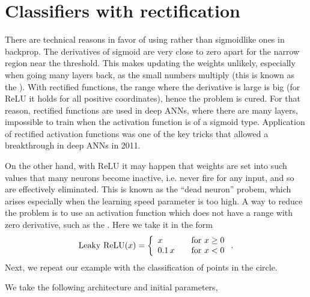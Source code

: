 \documentclass[letterpaper,10pt,english]{jupyterBook}
\begin{document}
\section{Classifiers with rectification}
\label{\detokenize{docs/rectification:classifiers-with-rectification}}
\sphinxAtStartPar
There are technical reasons in favor of using  rather than sigmoid\sphinxhyphen{}like ones in backprop. The derivatives of sigmoid are very close to zero apart for the narrow region near the threshold. This makes updating the weights unlikely, especially when going many layers back, as the small numbers multiply (this is known as the ). With rectified functions, the range where the derivative is large is big (for ReLU it holds for all positive coordinates), hence the problem is cured. For that reason, rectified functions are used in deep ANNs, where there are many layers, impossible to train when the activation function is of a sigmoid type.
Application of rectified activation functions was one of the key tricks that allowed a breakthrough in deep ANNs in 2011.

\sphinxAtStartPar
On the other hand, with ReLU it may happen that weights are set into such values that many neurons become inactive, i.e. never fire for any input, and so are effectively eliminated. This is known as the “dead neuron” probem, which arises especially when the learning speed parameter is too high. A way to reduce the problem is to use an activation function which does not have a range with zero derivative, such as the . Here we take it in the form
\begin{equation*}
\begin{split}
{\rm Leaky~ReLU}(x) = \left \{ \begin{array}{ll} x &{\rm ~~~ for~} x \ge 0 \\
                                          0.1 \, x &{\rm ~~~ for~} x < 0 \end{array}    \right . .
\end{split}
\end{equation*}
\sphinxAtStartPar
Next, we repeat our example with the classification of points in the circle.

\sphinxAtStartPar
We take the following architecture and initial parameters,

\begin{sphinxVerbatim}[commandchars=\\\{\}]
\PYG{p}{[}\PYG{p}{]}                   
  
                           
\end{sphinxVerbatim}
\end{document}
